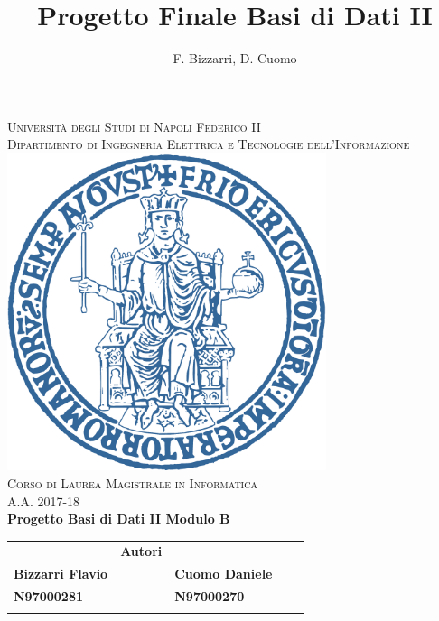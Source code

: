 \documentclass[a4paper,12pt]{book}
\newcommand{\makelogo}{%
	\centering
	\textsc{Università degli Studi di Napoli Federico II}
	\\[.4cm]
	\textsc{Dipartimento di Ingegneria Elettrica e Tecnologie dell'Informazione}
	\\[1.1cm]
	\includegraphics[width=0.7\textwidth]{./figures/logo_blu.png}\\[1.1cm]
	\textsc{Corso di Laurea Magistrale in Informatica\\A.A. 2017-18}
	\\[2.5cm]
	\textbf{Progetto Basi di Dati II Modulo B}
	\vfill
	\centering
	\begin{par}
		\begin{tabular}{lllll}
			& \textbf{Autori} &                        &  &  \\
			\textbf{Bizzarri Flavio} & \textbf{}       & \textbf{Cuomo Daniele} &  &  \\
			\textbf{N97000281}       & \textbf{}       & \textbf{N97000270}     &  &  \\
			&                 &                        &  & 
		\end{tabular}
	
	\end{par}
}
\begin{document}
	
	\onehalfspacing
	\author{F. Bizzarri, D. Cuomo}
	\title{Progetto Finale Basi di Dati II}
	
	{\frontmatter
		\let\cleardoublepage\clearpage{\makelogo}
		\thispagestyle{empty}
		
		
		
		\tableofcontents
		
		\thispagestyle{empty}
		\mainmatter
	}
	
	
	\let\cleardoublepage\clearpage{		
		
		
		
	}
		
	\backmatter
	
	
\end{document}
